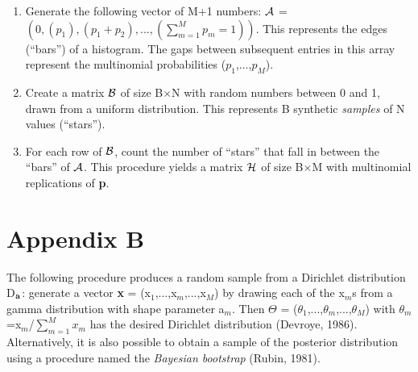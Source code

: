 \documentclass{article}
\begin{document}
\begin{enumerate}
\item  Generate the  following vector  of  M+1 numbers:  ${\cal A}$  =
$\left(0 , (p_1) ,  (p_1+p_2), ...  , (\sum_{m=1}^{M}p_m = 1)\right)$.
This represents the edges (``bars'') of a histogram.  The gaps between
subsequent   entries   in  this   array   represent  the   multinomial
probabilities ($p_1$,...,$p_M$).
\item  Create a  matrix  ${\cal  B}$ of  size  B$\times$N with  random
numbers  between 0  and 1,  drawn from  a uniform  distribution.  This
represents B synthetic {\it samples} of N values (``stars'').
\item For each  row of ${\cal B}$, count the  number of ``stars'' that
fall in between  the ``bars'' of ${\cal A}$.   This procedure yields a
matrix ${\cal H}$ of  size B$\times$M with multinomial replications of
{\bf p}.
\end{enumerate}

\section*{Appendix B} \label{app:B}

The  following procedure  produces a  random sample  from  a Dirichlet
distribution   D$_{\bf   a}$:   generate    a   vector   {\bf   x}   =
(x$_1$,...,x$_m$,...,x$_M$) by drawing each of the x$_m$s from a gamma
distribution   with   shape   parameter   a$_m$.   Then   $\Theta$   =
($\theta_1$,...,$\theta_m$,...,$\theta_M$)                         with
$\theta_m$=x$_m$/$\sum_{m=1}^{M}x_m$   has   the   desired   Dirichlet
distribution (Devroye,  1986).  Alternatively, it is  also possible to
obtain a sample of the  posterior distribution using a procedure named
the {\it Bayesian bootstrap} (Rubin, 1981).\\
\end{document}
